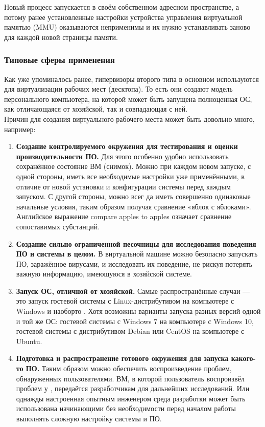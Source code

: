 \documentclass[14pt, a4paper]{article}
\begin{document}
Новый процесс запускается в своём собственном адресном пространстве, а потому ранее
установленные настройки устройства управления виртуальной памятью (MMU) оказываются
неприменимы и их нужно устанавливать заново для каждой новой страницы памяти.

\subsubsection*{Типовые сферы применения}

Как уже упоминалось ранее, гипервизоры второго типа в основном используются для виртуализации
рабочих мест (десктопа). То есть они создают модель персонального компьютера, на которой может
быть запущена полноценная ОС, как отличающаяся от хозяйской, так и совпадающая с ней.\\

Причин для создания виртуального рабочего места может быть довольно много, например:

\begin{enumerate}
    \item \textbf{Создание контролируемого окружения для тестирования и оценки производительности
    ПО.} Для этого особенно удобно использовать сохранённое состояние ВМ (снимок). Можно при
    каждом новом запуске, с одной стороны, иметь все необходимые настройки уже
    применёнными, в отличие от новой установки и конфигурации системы перед каждым
    запуском. С другой стороны, можно всег да иметь совершенно одинаковые начальные условия,
    таким образом получая сравнение «яблок с яблоками». Английское выражение compare apples
    to apples означает сравнение сопоставимых субстанций.
    \item \textbf{Создание сильно ограниченной песочницы для исследования поведения ПО и системы
    в целом.} В виртуальной машине можно безопасно запускать ПО, заражённое вирусами, и
    исследовать их поведение, не рискуя потерять важную информацию, имеющуюся в хозяйской
    системе.
    \item \textbf{Запуск ОС, отличной от хозяйской.} Самые распространённые случаи — это запуск гостевой
    системы с Linux-дистрибутивом на компьютере с Windows и наоборто . Хотя возможны
    варианты запуска разных версий одной и той же ОС: гостевой системы с Windows 7 на
    компьютере с Windows 10, гостевой системы с дистрибутивом Debian или CentOS на
    компьютере с Ubuntu.
    \item \textbf{Подготовка и распространение готового окружения для запуска какого-то ПО.} Таким
    образом можно обеспечить воспроизведение проблем, обнаруженных пользователями. ВМ, в
    которой пользователь воспроизвёл проблем у , передаётся разработчикам для дальнейших
    исследований. Или однажды настроенная опытным инженером среда разработки может быть
    использована начинающими без необходимости перед началом работы выполнять сложную
    настройку системы и ПО.
\end{enumerate}
\end{document}

